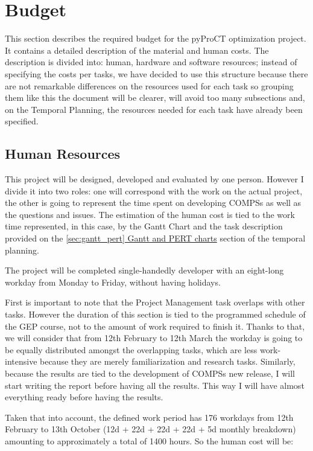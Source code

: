 \chapter{Budget}

This section describes the required budget for the pyProCT optimization project. It contains a detailed description of the material and human costs. The description is divided into: human, hardware and software resources; instead of specifying the costs per tasks, we have decided to use this structure because there are not remarkable differences on the resources used for each task so grouping them like this the document will be clearer, will avoid too many subsections and, on the Temporal Planning, the resources needed for each task have already been specified.

\section{Human Resources}


This project will be designed, developed and evaluated by one person. However I divide it into two roles: one will correspond with the work on the actual project, the other is going to represent the time spent on developing COMPSs as well as the questions and issues. The estimation of the human cost is tied to the work time represented, in this case, by the Gantt Chart and the task description provided on the \hyperref[sec:gantt_pert]{\ref*{sec:gantt_pert} Gantt and PERT charts} section of the temporal planning. 

The project will be completed single-handedly developer with an eight-long workday from Monday to Friday, without having holidays.

First is important to note that the Project Management task overlaps with other tasks. However the duration of this section is tied to the programmed schedule of the GEP course, not to the amount of work required to finish it. Thanks to that, we will consider that from 12th February to 12th March the workday is going to be equally distributed amongst the overlapping tasks, which are less work-intensive because they are merely familiarization and research tasks. Similarly, because the results are tied to the development of COMPSs new release, I will start writing the report before having all the results. This way I will have almost everything ready before having the results. 

Taken that into account, the defined work period has 176 workdays from 12th February to 13th October (12d + 22d + 22d + 22d + 5d monthly breakdown) amounting to approximately a total of 1400 hours. So the human cost will be:
\\

